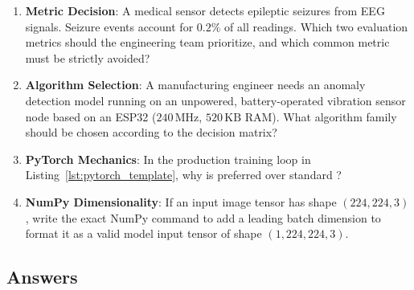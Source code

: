 \begin{checkyourself}
\begin{enumerate}
    \item \textbf{Metric Decision}: A medical sensor detects epileptic seizures from EEG signals. Seizure events account for $0.2\%$ of all readings. Which two evaluation metrics should the engineering team prioritize, and which common metric must be strictly avoided?
    \item \textbf{Algorithm Selection}: A manufacturing engineer needs an anomaly detection model running on an unpowered, battery-operated vibration sensor node based on an ESP32 ($240\,\text{MHz}$, $520\,\text{KB}$ RAM). What algorithm family should be chosen according to the decision matrix?
    \item \textbf{PyTorch Mechanics}: In the production training loop in Listing~\ref{lst:pytorch_template}, why is  preferred over standard ?
    \item \textbf{NumPy Dimensionality}: If an input image tensor has shape $(224, 224, 3)$, write the exact NumPy command to add a leading batch dimension to format it as a valid model input tensor of shape $(1, 224, 224, 3)$.
\end{enumerate}
\end{checkyourself}

\subsection*{Answers}

